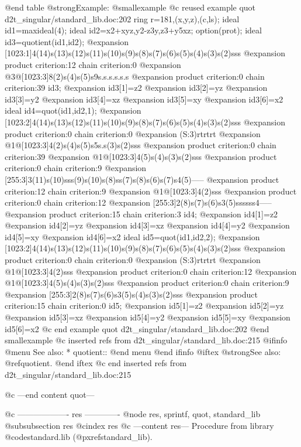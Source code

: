 @end table
@strong{Example:}
@smallexample
@c reused example quot d2t_singular/standard_lib.doc:202 
  ring r=181,(x,y,z),(c,ls);
ideal id1=maxideal(4);
ideal id2=x2+xyz,y2-z3y,z3+y5xz;
option(prot);
ideal id3=quotient(id1,id2);
@expansion{} [1023:1]4(14)s(13)s(12)s(11)s(10)s(9)s(8)s(7)s(6)s(5)s(4)s(3)s(2)sss
@expansion{} product criterion:12 chain criterion:0
@expansion{} @{3@}[1023:3]8(2)s(4)s(5)s9s.s.s.s.s.s
@expansion{} product criterion:0 chain criterion:39
id3;
@expansion{} id3[1]=z2
@expansion{} id3[2]=yz
@expansion{} id3[3]=y2
@expansion{} id3[4]=xz
@expansion{} id3[5]=xy
@expansion{} id3[6]=x2
ideal id4=quot(id1,id2,1);
@expansion{} [1023:2]4(14)s(13)s(12)s(11)s(10)s(9)s(8)s(7)s(6)s(5)s(4)s(3)s(2)sss
@expansion{} product criterion:0 chain criterion:0
@expansion{} (S:3)rtrtrt
@expansion{} @{1@}[1023:3]4(2)s(4)s(5)s5s.s(3)s(2)sss
@expansion{} product criterion:0 chain criterion:39
@expansion{} @{1@}[1023:3]4(5)s(4)s(3)s(2)sss
@expansion{} product criterion:0 chain criterion:9
@expansion{} [255:3]3(11)s(10)sss(9)s(10)s(8)ss(7)s(8)s(6)s(7)s4(5)-----
@expansion{} product criterion:12 chain criterion:9
@expansion{} @{1@}[1023:3]4(2)sss
@expansion{} product criterion:0 chain criterion:12
@expansion{} [255:3]2(8)s(7)s(6)s3(5)ssssss4-----
@expansion{} product criterion:15 chain criterion:3
id4;
@expansion{} id4[1]=z2
@expansion{} id4[2]=yz
@expansion{} id4[3]=xz
@expansion{} id4[4]=y2
@expansion{} id4[5]=xy
@expansion{} id4[6]=x2
ideal id5=quot(id1,id2,2);
@expansion{} [1023:2]4(14)s(13)s(12)s(11)s(10)s(9)s(8)s(7)s(6)s(5)s(4)s(3)s(2)sss
@expansion{} product criterion:0 chain criterion:0
@expansion{} (S:3)rtrtrt
@expansion{} @{1@}[1023:3]4(2)sss
@expansion{} product criterion:0 chain criterion:12
@expansion{} @{1@}[1023:3]4(5)s(4)s(3)s(2)sss
@expansion{} product criterion:0 chain criterion:9
@expansion{} [255:3]2(8)s(7)s(6)s3(5)s(4)s(3)s(2)sss
@expansion{} product criterion:15 chain criterion:0
id5;
@expansion{} id5[1]=z2
@expansion{} id5[2]=yz
@expansion{} id5[3]=xz
@expansion{} id5[4]=y2
@expansion{} id5[5]=xy
@expansion{} id5[6]=x2
@c end example quot d2t_singular/standard_lib.doc:202
@end smallexample
@c inserted refs from d2t_singular/standard_lib.doc:215
@ifinfo
@menu
See also:
* quotient::
@end menu
@end ifinfo
@iftex
@strong{See also:}
@ref{quotient}.
@end iftex
@c end inserted refs from d2t_singular/standard_lib.doc:215

@c ---end content quot---

@c ------------------- res -------------
@node res, sprintf, quot, standard_lib
@subsubsection res
@cindex res
@c ---content res---
Procedure from library @code{standard.lib} (@pxref{standard_lib}).

